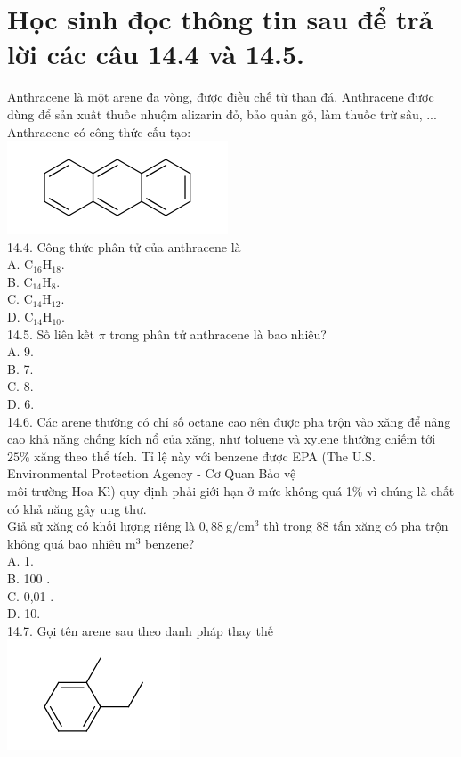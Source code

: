 \documentclass[10pt]{article}
\begin{document}
\section*{Học sinh đọc thông tin sau để trả lời các câu 14.4 và 14.5.}
Anthracene là một arene đa vòng, được điều chế từ than đá. Anthracene được dùng để sản xuất thuốc nhuộm alizarin đỏ, bảo quản gỗ, làm thuốc trừ sâu, ... Anthracene có công thức cấu tạo:\\
\includegraphics{smile-b1594e1a2f7ddfa1b903998e0cba4369cf72ada9}\\
14.4. Công thức phân tử của anthracene là\\
A. $\mathrm{C}_{16} \mathrm{H}_{18}$.\\
B. $\mathrm{C}_{14} \mathrm{H}_{8}$.\\
C. $\mathrm{C}_{14} \mathrm{H}_{12}$.\\
D. $\mathrm{C}_{14} \mathrm{H}_{10}$.\\
14.5. Số liên kết $\pi$ trong phân tử anthracene là bao nhiêu?\\
A. 9.\\
B. 7.\\
C. 8.\\
D. 6.\\
14.6. Các arene thường có chỉ số octane cao nên được pha trộn vào xăng để nâng cao khả năng chống kích nổ của xăng, như toluene và xylene thường chiếm tới $25 \%$ xăng theo thể tích. Tỉ lệ này với benzene được EPA (The U.S. Environmental Protection Agency - Cơ Quan Bảo vệ\\
môi trường Hoa Kì) quy định phải giới hạn ở mức không quá 1\% vì chúng là chất có khả năng gây ung thư.\\
Giả sử xăng có khối lượng riêng là $0,88 \mathrm{~g} / \mathrm{cm}^{3}$ thì trong 88 tấn xăng có pha trộn không quá bao nhiêu $\mathrm{m}^{3}$ benzene?\\
A. 1.\\
B. 100 .\\
C. 0,01 .\\
D. 10.\\
14.7. Gọi tên arene sau theo danh pháp thay thế\\
\includegraphics{smile-34d7af5950e933d24fc604d47a3efe58fab77190}\\
\end{document}

